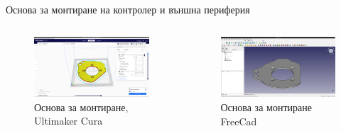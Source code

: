 \documentclass[handout]{beamer}
\begin{document}
\begin{frame}{Основа за монтиране на контролер и външна периферия}
	\begin{columns}
	\begin{figure}[htpb!]
		\centering
		\includegraphics[width=1\textwidth]{Images/ultimaker_cura_window.png}
		\caption{Основа за монтиране, Ultimaker Cura}
	\end{figure}


	\begin{figure}[htpb!]
		\centering
		\includegraphics[width=1\textwidth]{Images/freecad_window.png}
		\caption{Основа за монтиране FreeCad}
	\end{figure}
\end{columns}

\end{frame}
\end{document}
